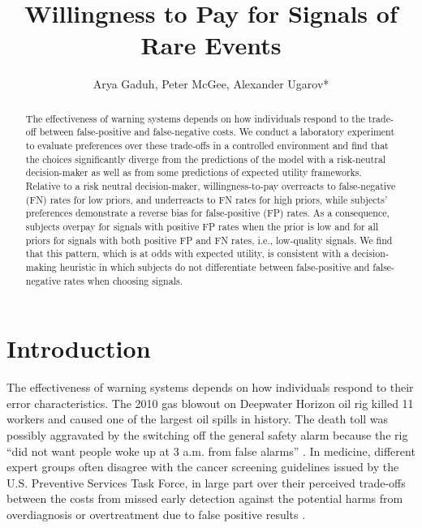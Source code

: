 \documentclass[12pt,a4paper]{article}
\title{\Large Willingness to Pay for Signals of Rare Events\\}
\author{\large Arya Gaduh, Peter McGee, Alexander Ugarov*}
\begin{document}
\maketitle
\onehalfspacing
\begin{abstract}{%
\noindent The effectiveness of warning systems depends on how individuals respond to the trade-off between false-positive and false-negative costs. We conduct a laboratory experiment to evaluate preferences over these trade-offs in a controlled environment and find that the choices significantly diverge from the predictions of the model with a risk-neutral decision-maker as well as from some predictions of expected utility frameworks. Relative to a risk neutral decision-maker, willingness-to-pay overreacts to false-negative (FN) rates for low priors, and underreacts to FN rates for high priors, while subjects' preferences demonstrate a reverse bias for false-positive (FP) rates. As a consequence, subjects overpay for signals with positive FP rates when the prior is low and for all priors for signals with both positive FP and FN rates, i.e., low-quality signals. We find that this pattern, which is at odds with expected utility, is consistent with a decision-making heuristic in which subjects do not differentiate between false-positive and false-negative rates when choosing signals.}


\vspace{10pt}
\begin{singlespace}

\end{singlespace}
\end{abstract}

\vspace{180pt}
\newpage
\normalsize

\section{Introduction}

The effectiveness of warning systems depends on how individuals respond to their error characteristics. The 2010 gas blowout on Deepwater Horizon oil rig killed 11 workers and caused one of the largest oil spills in history. The death toll was possibly aggravated by the switching off the general safety alarm because the rig ``did not want people woke up at 3 a.m. from false alarms'' \citep{brown_oil_2010}. In medicine, different expert groups often disagree with the cancer screening guidelines issued by the U.S. Preventive Services Task Force, in large part over their perceived trade-offs between the costs from missed early detection against the potential harms from overdiagnosis or overtreatment due to false positive results \citep{rabin_reversal_2024}.
\end{document}
